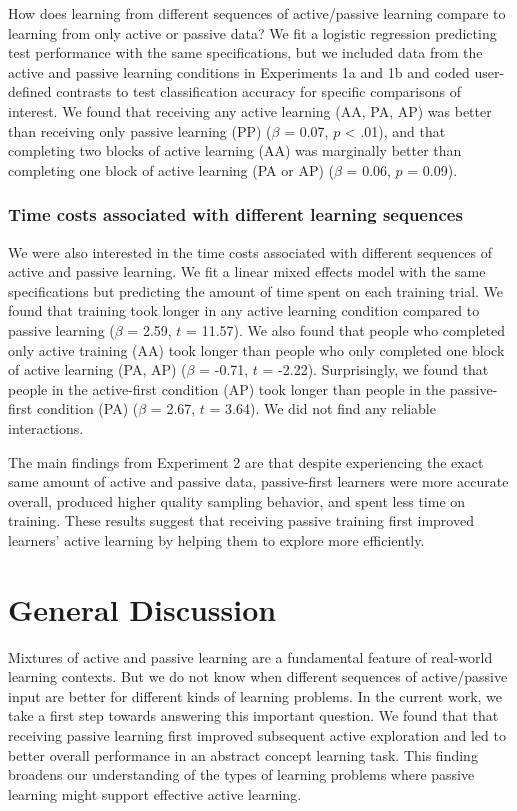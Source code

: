 \documentclass[10pt, letterpaper]{article}
\begin{document}
How does learning from different sequences of active/passive learning
compare to learning from only active or passive data? We fit a logistic
regression predicting test performance with the same specifications, but
we included data from the active and passive learning conditions in
Experiments 1a and 1b and coded user-defined contrasts to test
classification accuracy for specific comparisons of interest. We found
that receiving any active learning (AA, PA, AP) was better than
receiving only passive learning (PP) (\(\beta\) = 0.07, \(p\)
\textless{} .01), and that completing two blocks of active learning (AA)
was marginally better than completing one block of active learning (PA
or AP) (\(\beta\) = 0.06, \(p\) = 0.09).

\subsubsection{Time costs associated with different learning
sequences}\label{time-costs-associated-with-different-learning-sequences}

We were also interested in the time costs associated with different
sequences of active and passive learning. We fit a linear mixed effects
model with the same specifications but predicting the amount of time
spent on each training trial. We found that training took longer in any
active learning condition compared to passive learning (\(\beta\) =
2.59, \(t\) = 11.57). We also found that people who completed only
active training (AA) took longer than people who only completed one
block of active learning (PA, AP) (\(\beta\) = -0.71, \(t\) = -2.22).
Surprisingly, we found that people in the active-first condition (AP)
took longer than people in the passive-first condition (PA) (\(\beta\) =
2.67, \(t\) = 3.64). We did not find any reliable interactions.

The main findings from Experiment 2 are that despite experiencing the
exact same amount of active and passive data, passive-first learners
were more accurate overall, produced higher quality sampling behavior,
and spent less time on training. These results suggest that receiving
passive training first improved learners' active learning by helping
them to explore more efficiently.

\section{General Discussion}\label{general-discussion}

Mixtures of active and passive learning are a fundamental feature of
real-world learning contexts. But we do not know when different
sequences of active/passive input are better for different kinds of
learning problems. In the current work, we take a first step towards
answering this important question. We found that that receiving passive
learning first improved subsequent active exploration and led to better
overall performance in an abstract concept learning task. This finding
broadens our understanding of the types of learning problems where
passive learning might support effective active learning.
\end{document}
